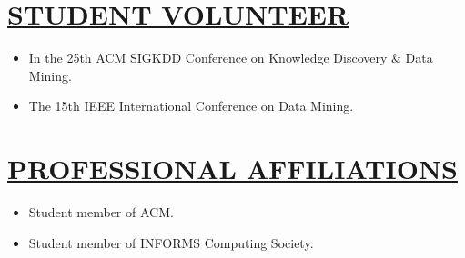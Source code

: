 \documentclass[11pt,letterpage]{res}
\begin{document}
\begin{resume}
\section{\underline{STUDENT VOLUNTEER}}
\begin{itemize}
\item In the 25th ACM SIGKDD Conference on Knowledge Discovery \& Data Mining.
\item The 15th IEEE International Conference on Data Mining.
\end{itemize}

\section{\underline{PROFESSIONAL AFFILIATIONS}}
\begin{itemize}
\item Student member of ACM.
\item Student member of INFORMS Computing Society.
\end{itemize}

\end{resume}
\end{document}

